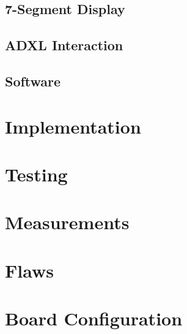\documentclass[11pt,british]{report}
\begin{document}
\subsection*{7-Segment Display}
\subsection*{ADXL Interaction}
\subsection*{Software}

\section*{Implementation}

\section*{Testing}

\section*{Measurements}

\section*{Flaws}

\section*{Board Configuration}
\end{document}

